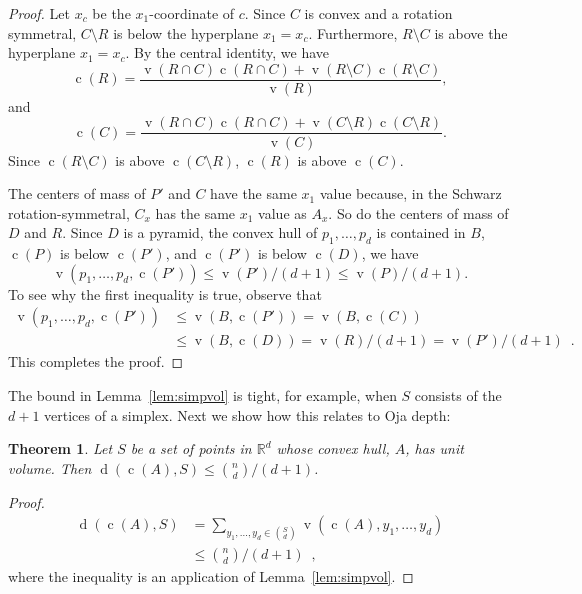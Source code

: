 \documentclass[preprint, 12pt]{elsarticle}
\newtheorem{thm}{Theorem}
\DeclareMathOperator{\od}{d}
\DeclareMathOperator{\vol}{v}
\DeclareMathOperator{\cog}{c}
\newcommand{\R}{\mathbb{R}}
\begin{document}
\begin{proof}
Let $x_{c}$ be the $x_{1}$-coordinate of $c$. Since $C$ is convex and
 a rotation symmetral, $C\setminus R$ is below the hyperplane $x_{1}
 = x_{c}$.  Furthermore, $R\setminus C$ is above the hyperplane
 $x_1=x_{c}$. By the central identity, we have
\[
\cog(R) = \frac{\vol(R \cap C)\cog(R \cap C) + \vol(R \setminus C)\cog(R \setminus C)}{\vol(R)},
\]
and
\[
\cog(C) = \frac{\vol(R \cap C)\cog(R \cap C) + \vol(C \setminus R)\cog(C \setminus R)}{\vol(C)}.
\]
Since $\cog(R \setminus C)$ is above $\cog(C \setminus R)$, $\cog(R)$ is above $\cog(C)$.

The centers of mass of $P'$ and $C$ have the same $x_1$ value because, in the
Schwarz rotation-symmetral, $C_{x}$ has the same $x_{1}$ value as $A_{x}$.
So do the centers of mass of $D$ and $R$. Since $D$ is a pyramid, the convex hull of $p_1,\ldots,p_d$ is contained
in $B$,  $\cog(P)$ is below $\cog(P')$, and $\cog(P')$ is below $\cog(D)$, we have 
\[ \vol(p_1,\ldots,p_d,\cog(P')) \leq \vol(P')/(d+1) \leq \vol(P)/(d+1).\]
To see why the first inequality is true, observe that 
\[
  \begin{aligned}
    \vol(p_1,\ldots,p_d,\cog(P')) &
   \le \vol(B,\cog(P')) 
   = \vol(B,\cog(C)) \\
   & \le\vol(B,\cog(D))= \vol(R)/(d+1) = \vol(P')/(d+1) \enspace .
  \end{aligned}
\]
This completes the proof.
\end{proof}

The bound in Lemma~\ref{lem:simpvol} is tight, for example, when $S$
consists of the $d+1$ vertices of a simplex. Next we show how this
relates to Oja depth:

\begin{thm}
  \label{thm:ndcenter}
  Let $S$ be a set of points in $\R^d$ whose convex hull, $A$, has unit volume. Then $\od(\cog(A),S)\le \binom{n}{d}/(d+1)$.
\end{thm}

\begin{proof}
  \[
    \begin{aligned}
     \od(\cog(A), S) 
      & = \sum_{y_{1},\ldots , y_{d} \in \binom{S}{d}} \vol(\cog(A), y_{1}, \ldots,
y_{d}) \\
      & \leq \binom{n}{d}/(d+1) \enspace ,
    \end{aligned} \]
where the inequality is an application of Lemma~\ref{lem:simpvol}.
\end{proof}
\end{document}
